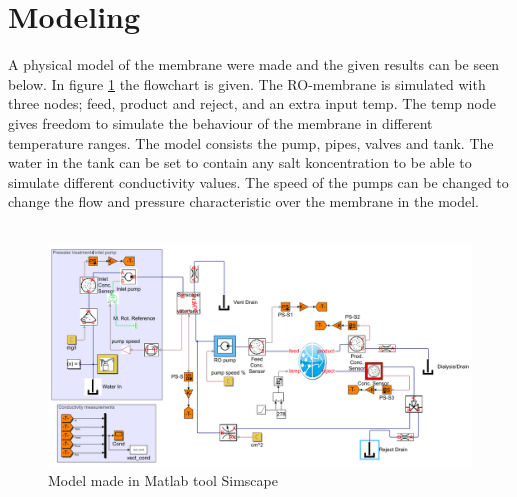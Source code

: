 \section{Modeling}
A physical model of the membrane were made and the given results can be seen below. In figure \ref{fig:simscape} the flowchart is given. The RO-membrane is simulated with three nodes; feed, product and reject, and an extra input temp. The temp node gives freedom to simulate the behaviour of the membrane in different temperature ranges. The model consists the pump, pipes, valves and tank. The water in the tank can be set to contain any salt koncentration to be able to simulate different conductivity values. The speed of the pumps can be changed to change the flow and pressure characteristic over the membrane in the model.\\
\\
\begin{figure}[h]
\label{fig:simscape}
\centering
\includegraphics[width=\textwidth]{simscape_fc1.PNG}
\caption{Model made in Matlab tool Simscape}
\end{figure}


